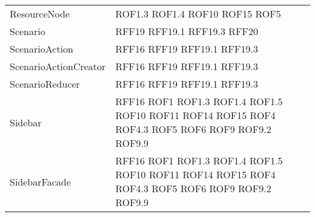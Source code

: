 \begin{longtable}{p{5cm}!{\VRule[1pt]}p{2.5cm}}
	ResourceNode & ROF1.3 \newline ROF1.4 \newline ROF10 \newline ROF15 \newline ROF5\\
	Scenario & RFF19 \newline RFF19.1 \newline RFF19.3 \newline RFF20\\
	ScenarioAction & RFF16 \newline RFF19 \newline RFF19.1 \newline RFF19.3\\
	ScenarioActionCreator & RFF16 \newline RFF19 \newline RFF19.1 \newline RFF19.3\\
	ScenarioReducer & RFF16 \newline RFF19 \newline RFF19.1 \newline RFF19.3\\
	Sidebar & RFF16 \newline ROF1 \newline ROF1.3 \newline ROF1.4 \newline ROF1.5 \newline ROF10 \newline ROF11 \newline ROF14 \newline ROF15 \newline ROF4 \newline ROF4.3 \newline ROF5 \newline ROF6 \newline ROF9 \newline ROF9.2 \newline ROF9.9\\
	SidebarFacade & RFF16 \newline ROF1 \newline ROF1.3 \newline ROF1.4 \newline ROF1.5 \newline ROF10 \newline ROF11 \newline ROF14 \newline ROF15 \newline ROF4 \newline ROF4.3 \newline ROF5 \newline ROF6 \newline ROF9 \newline ROF9.2 \newline ROF9.9\\

\end{longtable}
